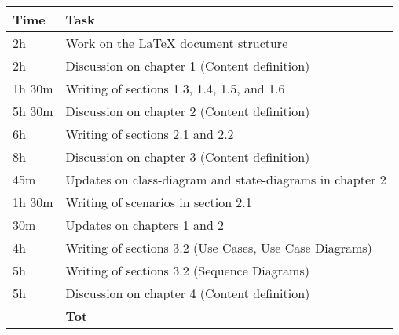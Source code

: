 \begin{center}
    {\renewcommand{\arraystretch}{2}%
    \begin{tabular}{L{2cm}L{12cm}}
        \hline
        \textbf{Time} & \textbf{Task} \\
        \hline
        2h & Work on the LaTeX document structure \\
        \hline
        2h & Discussion on chapter 1 (Content definition) \\
        \hline
        1h 30m& Writing of sections 1.3, 1.4, 1.5, and 1.6 \\
        \hline
        5h 30m & Discussion on chapter 2 (Content definition) \\
        \hline
        6h & Writing of sections 2.1 and 2.2 \\
        \hline
        8h & Discussion on chapter 3 (Content definition) \\
        \hline
        45m & Updates on class-diagram and state-diagrams in chapter 2 \\
        \hline
        1h 30m & Writing of scenarios in section 2.1 \\
        \hline
        30m & Updates on chapters 1 and 2 \\
        \hline
        4h & Writing of sections 3.2 (Use Cases, Use Case Diagrams) \\
        \hline
        5h & Writing of sections 3.2 (Sequence Diagrams) \\
        \hline
        5h & Discussion on chapter 4 (Content definition) \\
        \hline
        \textbf{} & \textbf{Tot} \\
    \end{tabular}}
\end{center}